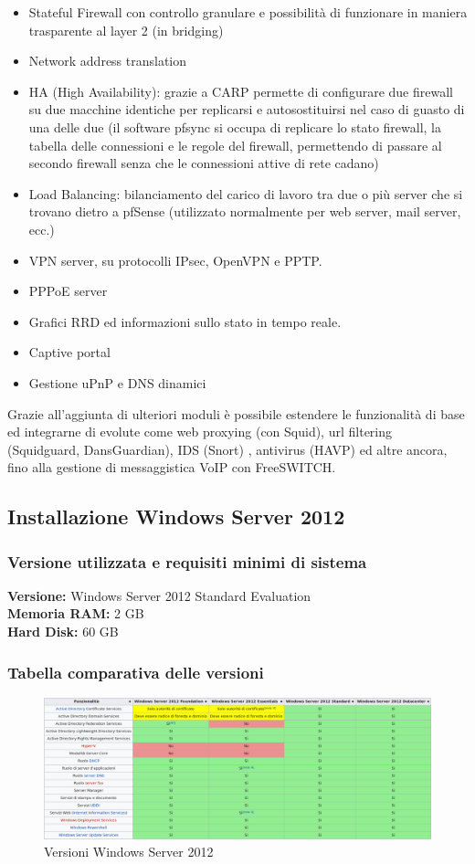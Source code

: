 \documentclass{article}
\begin{document}
\begin{itemize}
    \item Stateful Firewall con controllo granulare e possibilità di funzionare in maniera trasparente al layer 2 (in bridging)
    \item Network address translation
    \item HA (High Availability): grazie a CARP permette di configurare due firewall su due macchine identiche per replicarsi e autosostituirsi nel caso di guasto di una delle due (il software pfsync si occupa di replicare lo stato firewall, la tabella delle connessioni e le regole del firewall, permettendo di passare al secondo firewall senza che le connessioni attive di rete cadano)
    \item Load Balancing: bilanciamento del carico di lavoro tra due o più server che si trovano dietro a pfSense (utilizzato normalmente per web server, mail server, ecc.)
    \item VPN server, su protocolli IPsec, OpenVPN e PPTP.
    \item PPPoE server
    \item Grafici RRD ed informazioni sullo stato in tempo reale.
    \item Captive portal
    \item Gestione uPnP e DNS dinamici
\end{itemize}
Grazie all'aggiunta di ulteriori moduli è possibile estendere le funzionalità di base ed integrarne di evolute come web proxying (con Squid), url filtering (Squidguard, DansGuardian), IDS (Snort) , antivirus (HAVP) ed altre ancora, fino alla gestione di messaggistica VoIP con FreeSWITCH. 

\subsection{Installazione Windows Server 2012}
\subsubsection{Versione utilizzata e requisiti minimi di sistema}
\textbf{Versione:} Windows Server 2012 Standard Evaluation\\
\textbf{Memoria RAM:} 2 GB \\
\textbf{Hard Disk:} 60 GB

\subsubsection{Tabella comparativa delle versioni}
\begin{figure}[H]
    \center
    \includegraphics[scale=0.3]{images/tabecomp.png}
    \caption{Versioni Windows Server 2012}\label{fig:1}
\end{figure}
\end{document}
